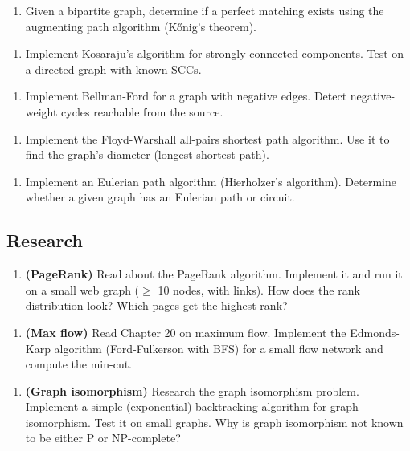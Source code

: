 \begin{enumerate}
\item Given a bipartite graph, determine if a perfect matching exists using the augmenting path algorithm (Kőnig's theorem).
\end{enumerate}

\begin{enumerate}
\item Implement Kosaraju's algorithm for strongly connected components. Test on a directed graph with known SCCs.
\end{enumerate}

\begin{enumerate}
\item Implement Bellman-Ford for a graph with negative edges. Detect negative-weight cycles reachable from the source.
\end{enumerate}

\begin{enumerate}
\item Implement the Floyd-Warshall all-pairs shortest path algorithm. Use it to find the graph's diameter (longest shortest path).
\end{enumerate}

\begin{enumerate}
\item Implement an Eulerian path algorithm (Hierholzer's algorithm). Determine whether a given graph has an Eulerian path or circuit.
\end{enumerate}

\subsection{Research}

\begin{enumerate}
\item \textbf{(PageRank)} Read about the PageRank algorithm. Implement it and run it on a small web graph ($\ge $ 10 nodes, with links). How does the rank distribution look? Which pages get the highest rank?
\end{enumerate}

\begin{enumerate}
\item \textbf{(Max flow)} Read Chapter 20 on maximum flow. Implement the Edmonds-Karp algorithm (Ford-Fulkerson with BFS) for a small flow network and compute the min-cut.
\end{enumerate}

\begin{enumerate}
\item \textbf{(Graph isomorphism)} Research the graph isomorphism problem. Implement a simple (exponential) backtracking algorithm for graph isomorphism. Test it on small graphs. Why is graph isomorphism not known to be either P or NP-complete?
\end{enumerate}

